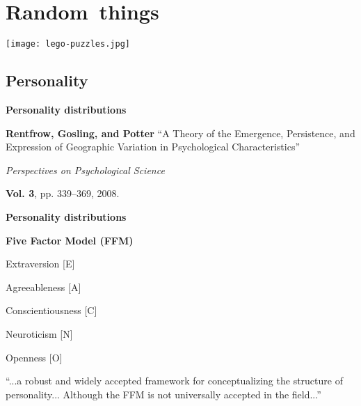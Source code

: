 

  

\section{Random\ things}

  \begin{center}
    \texttt{[image: lego-puzzles.jpg]}
  \end{center}

\subsection{Personality}

  \textbf{Personality distributions}

  \textbf{Rentfrow, Gosling, and Potter\cite{rentfrow2008a}}
    ``A Theory of the Emergence, Persistence, and Expression of Geographic Variation in  Psychological Characteristics''

    \smallskip

    \textit{Perspectives on Psychological Science}

    \smallskip

    \textbf{Vol. 3}, pp. 339--369, 2008.
  


  \textbf{Personality distributions}

  \textbf{Five Factor Model (FFM)}
    
     
      Extraversion [E]
     
      Agreeableness [A]
     
      Conscientiousness [C]
     
      Neuroticism [N]
     
      Openness [O]
    

    \bigskip
    
    {
      ``...a robust and widely accepted framework for 
      conceptualizing the structure of personality...
      Although the FFM is not universally accepted in the field...''\cite{rentfrow2008a}
    }
    
    \bigskip

